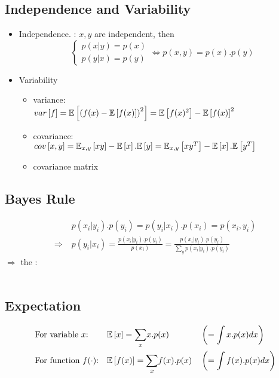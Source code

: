 \subsection{Independence and Variability}
\begin{itemize}
	\item Independence. \Eg: $x, y$ are independent, then
	\[\begin{cases}
		p(x|y) = p(x)\\
		p(y|x) = p(y)
	\end{cases}
	\iff p(x,y) = p(x).p(y)\]
	
	\item Variability
	\begin{itemize}
		\item variance:\\ $var \left[f\right] = \mathbb{E} \left[ \left(f(x)-\mathbb{E} \left[ f(x) \right]\right)^2 \right] = \mathbb{E} \left[ f(x)^2 \right] - \mathbb{E} \left[ f(x) \right]^2$
		\item covariance:\\ $cov \left[x, y\right] = \mathbb{E}_{x,y}\left[xy\right] - \mathbb{E} \left[ x \right].\mathbb{E} \left[ y \right] = \mathbb{E}_{x,y}\left[xy^T\right] - \mathbb{E} \left[ x \right].\mathbb{E} \left[ y^T \right]$
		\item covariance matrix
	\end{itemize}
\end{itemize}

\subsection{Bayes Rule}
\label{subsec:bayes-rule}
\begin{align*}
	& p(x_i|y_i).p(y_i) = p(y_i|x_i).p(x_i) = p(x_i, y_i) \\
	\Rightarrow\; &p(y_i|x_i) = \frac{p(x_i|y_i).p(y_i)}{p(x_i)} = \frac{p(x_i|y_i).p(y_i)}{\underset{y}{\sum} p(x_i|y_i).p(y_i)}
\end{align*}
$\Rightarrow$ the :\\~\\

\subsection{Expectation}
\label{subsec:expectation}
\begin{align*}
	& \text{For variable $x$:} && \mathbb{E} \left[ x \right] = \underset{x}{\sum}x.p(x) && \left( = \int x.p(x)dx \right)\\
	& \text{For function $f(\cdot)$:} && \mathbb{E} \left[ f(x) \right] = \underset{x}{\sum}f(x).p(x) && \left( = \int f(x).p(x)dx \right)
\end{align*}

